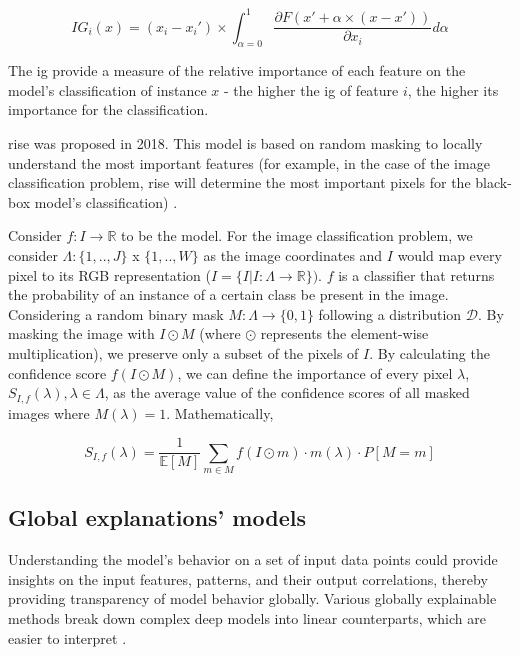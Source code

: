\begin{equation}
IG_i (x) = ( x_i - x_i' ) \times \int_{\alpha=0}^1 \frac{\partial F(x' + \alpha \times (x - x'))}{\partial x_i} d\alpha
\end{equation}

The \gls{ig} provide a measure of the relative importance of each feature on the model's classification of instance $x$ - the higher the \gls{ig} of feature $i$, the higher its importance for the classification.

\gls{rise} was proposed in 2018. This model is based on random masking to locally understand the most important features (for example, in the case of the image classification problem, \gls{rise} will determine the most important pixels for the black-box model's classification) \cite{RISE}. 

Consider $f: I \rightarrow \mathbb{R}$ to be the model. For the image classification problem, we consider $\Lambda: \{1, .., J\}$ x $\{1, .., W\}$ as the image coordinates and $I$ would map every pixel to its RGB representation ($I = \{ I | I: \Lambda \rightarrow \mathbb{R} \})$. $f$ is a classifier that returns the probability of an instance of a certain class be present in the image. Considering a random binary mask $ M : \Lambda \rightarrow \{0,1\} $ following a distribution $\mathcal{D}$. By masking the image with $I \odot M$ (where $\odot$ represents the element-wise multiplication), we preserve only a subset of the pixels of $I$. By calculating the confidence score $f(I \odot M)$, we can define the importance of every pixel $\lambda$, $S_{I,f}(\lambda), \lambda \in \Lambda $, as the average value of the confidence scores of all masked images where $M(\lambda) = 1$. Mathematically,

\begin{equation}
S_{I,f}(\lambda) = \dfrac{1}{\mathds{E}[M]} \sum_{m \in M} f(I \odot m) \cdot m(\lambda) \cdot P[M = m]
\end{equation}

\subsection{Global explanations' models}

Understanding the model's behavior on a set of input data points could provide insights on the input features, patterns, and their output correlations, thereby providing transparency of model behavior globally. Various globally explainable methods break down complex deep models into linear counterparts, which are easier to interpret \cite{XAI}.

